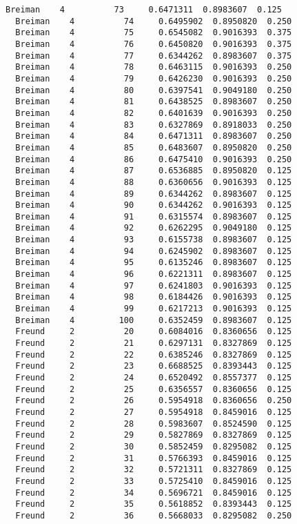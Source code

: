 \documentclass[11pt]{article}
\begin{document}
\begin{Verbatim}[commandchars=\\\{\}]
  Breiman    4          73     0.6471311  0.8983607  0.125
  Breiman    4          74     0.6495902  0.8950820  0.250
  Breiman    4          75     0.6545082  0.9016393  0.375
  Breiman    4          76     0.6450820  0.9016393  0.375
  Breiman    4          77     0.6344262  0.8983607  0.375
  Breiman    4          78     0.6463115  0.9016393  0.250
  Breiman    4          79     0.6426230  0.9016393  0.250
  Breiman    4          80     0.6397541  0.9049180  0.250
  Breiman    4          81     0.6438525  0.8983607  0.250
  Breiman    4          82     0.6401639  0.9016393  0.250
  Breiman    4          83     0.6327869  0.8918033  0.250
  Breiman    4          84     0.6471311  0.8983607  0.250
  Breiman    4          85     0.6483607  0.8950820  0.250
  Breiman    4          86     0.6475410  0.9016393  0.250
  Breiman    4          87     0.6536885  0.8950820  0.125
  Breiman    4          88     0.6360656  0.9016393  0.125
  Breiman    4          89     0.6344262  0.8983607  0.125
  Breiman    4          90     0.6344262  0.9016393  0.125
  Breiman    4          91     0.6315574  0.8983607  0.125
  Breiman    4          92     0.6262295  0.9049180  0.125
  Breiman    4          93     0.6155738  0.8983607  0.125
  Breiman    4          94     0.6245902  0.8983607  0.125
  Breiman    4          95     0.6135246  0.8983607  0.125
  Breiman    4          96     0.6221311  0.8983607  0.125
  Breiman    4          97     0.6241803  0.9016393  0.125
  Breiman    4          98     0.6184426  0.9016393  0.125
  Breiman    4          99     0.6217213  0.9016393  0.125
  Breiman    4         100     0.6352459  0.8983607  0.125
  Freund     2          20     0.6084016  0.8360656  0.125
  Freund     2          21     0.6297131  0.8327869  0.125
  Freund     2          22     0.6385246  0.8327869  0.125
  Freund     2          23     0.6688525  0.8393443  0.125
  Freund     2          24     0.6520492  0.8557377  0.125
  Freund     2          25     0.6356557  0.8360656  0.125
  Freund     2          26     0.5954918  0.8360656  0.250
  Freund     2          27     0.5954918  0.8459016  0.125
  Freund     2          28     0.5983607  0.8524590  0.125
  Freund     2          29     0.5827869  0.8327869  0.125
  Freund     2          30     0.5852459  0.8295082  0.125
  Freund     2          31     0.5766393  0.8459016  0.125
  Freund     2          32     0.5721311  0.8327869  0.125
  Freund     2          33     0.5725410  0.8459016  0.125
  Freund     2          34     0.5696721  0.8459016  0.125
  Freund     2          35     0.5618852  0.8393443  0.125
  Freund     2          36     0.5668033  0.8295082  0.250

\end{Verbatim}
\end{document}
